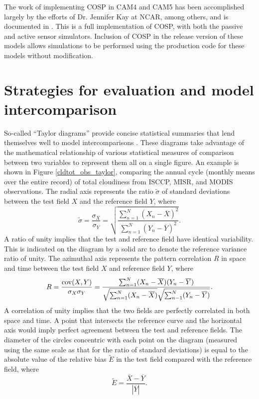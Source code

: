 The work of implementing COSP in CAM4 and CAM5 has been accomplished largely by the efforts of Dr. Jennifer Kay at NCAR, among others, and is documented in \cite{kay_et_al_2011}. This is a full implementation of COSP, with both the passive and active sensor simulators. Inclusion of COSP in the release version of these models allows simulations to be performed using the production code for these models without modification.

\section{Strategies for evaluation and model intercomparison}
So-called ``Taylor diagrams'' \citep{taylor_2001} provide concise statistical summaries that lend themselves well to model intercomparisons \citep{gleckler_et_al_2008,pincus_et_al_2008}. These diagrams take advantage of the mathematical relationship of various statistical measures of comparison between two variables to represent them all on a single figure. An example is shown in Figure \ref{cldtot_obs_taylor}, comparing the annual cycle (monthly means over the entire record) of total cloudiness from ISCCP, MISR, and MODIS observations. The radial axis represents the ratio $\tilde{\sigma}$ of standard deviations between the test field $X$ and the reference field $Y$, where
\[
    \tilde{\sigma} = \frac{\sigma_X}{\sigma_Y}
        = \sqrt{\frac{\sum_{n=1}^N (X_n - \overline{X})^2}
            {\sum_{n=1}^N (Y_n - \overline{Y})^2}}.
\]
A ratio of unity implies that the test and reference field have identical variability. This is indicated on the diagram by a solid arc to denote the reference variance ratio of unity. The azimuthal axis represents the pattern correlation $R$ in space and time between the test field $X$ and reference field $Y$, where
\[
    R = \frac{{\rm cov}(X,Y)}{\sigma_X \sigma_Y}
      = \frac{\sum_{n=1}^N (X_n - \overline{X})(Y_n - \overline{Y})}{\sqrt{\sum_{n=1}^N (X_n - \overline{X})}\sqrt{\sum_{n-1}^N (Y_n - \overline{Y})}}.
\]
A correlation of unity implies that the two fields are perfectly correlated in both space and time. A point that intersects the reference curve and the horizontal axis would imply perfect agreement between the test and reference fields. The diameter of the circles concentric with each point on the diagram (measured using the same scale as that for the ratio of standard deviations) is equal to the absolute value of the relative bias $\tilde{E}$ in the test field compared with the reference field, where
\[
    \tilde{E} = \frac{\overline{X} - \overline{Y}}{\left|\overline{Y}\right|}.
\]

